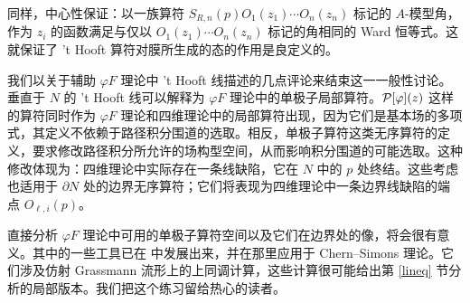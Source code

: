 同样，中心性保证：以一族算符 $S_{R,n}(p) O_1(z_1) \cdots O_n(z_n)$ 标记的 $A$-模型角，作为 $z_i$ 的函数满足与仅以 $O_1(z_1) \cdots O_n(z_n)$ 标记的角相同的 Ward 恒等式。这就保证了 't Hooft 算符对膜所生成的态的作用是良定义的。

我们以关于辅助 $\varphi F$ 理论中 't Hooft 线描述的几点评论来结束这一一般性讨论。垂直于 $N$ 的 't Hooft 线可以解释为 $\varphi F$ 理论中的单极子局部算符。${\cal P}[\varphi](z)$ 这样的算符同时作为 $\varphi F$ 理论和四维理论中的局部算符出现，因为它们是基本场的多项式，其定义不依赖于路径积分围道的选取。相反，单极子算符这类无序算符的定义，要求修改路径积分所允许的场构型空间，从而影响积分围道的可能选取。这种修改体现为：四维理论中实际存在一条线缺陷，它在 $N$ 中的 $p$ 处终结。这些考虑也适用于 $\partial N$ 处的边界无序算符；它们将表现为四维理论中一条边界线缺陷的端点 $O_{\ell,i}(p)$。

直接分析 $\varphi F$ 理论中可用的单极子算符空间以及它们在边界处的像，将会很有意义。其中的一些工具已在 \cite{Gaiotto:2016wcv} 中发展出来，并在那里应用于 Chern–Simons 理论。它们涉及仿射 Grassmann 流形上的上同调计算，这些计算很可能给出第 \ref{lineq} 节分析的局部版本。我们把这个练习留给热心的读者。

